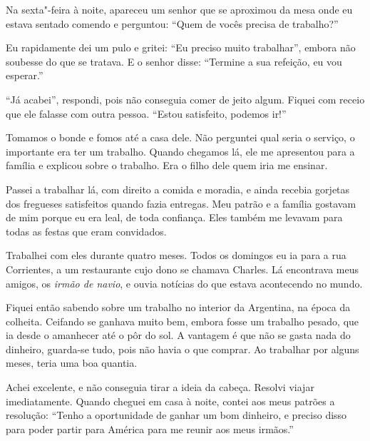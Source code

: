 Na sexta"-feira à noite, apareceu um senhor que se aproximou da mesa onde
eu estava sentado comendo e perguntou: ``Quem de vocês precisa de trabalho?''

Eu rapidamente dei um pulo e gritei: ``Eu preciso muito trabalhar'', embora não soubesse do que se tratava. E o senhor disse: ``Termine a sua refeição, eu vou esperar.''

``Já acabei'', respondi, pois não conseguia comer de jeito algum. Fiquei
com receio que ele falasse com outra pessoa. ``Estou satisfeito, podemos
ir!''

Tomamos o bonde e fomos até a casa dele. Não perguntei qual
seria o serviço, o importante era ter um trabalho. Quando
chegamos lá, ele me apresentou para a família e explicou sobre o
trabalho. Era o filho dele quem iria me ensinar.


Passei a trabalhar lá, com direito a comida e moradia, e ainda
recebia gorjetas dos fregueses satisfeitos quando fazia entregas. Meu
patrão e a família gostavam de mim porque eu era leal, de toda
confiança. Eles também me levavam para todas as festas que eram convidados.

Trabalhei com eles durante quatro meses. Todos os domingos eu ia para a rua
Corrientes, a um restaurante cujo dono se chamava Charles. Lá encontrava meus 
amigos, os \textit{irmão de navio}, e ouvia notícias do
que estava acontecendo no mundo.

Fiquei então sabendo sobre um trabalho no interior da Argentina, na
época da colheita. Ceifando se ganhava muito bem, embora fosse um
trabalho pesado, que ia desde o amanhecer até o pôr do sol. A vantagem é que
não se gasta nada do dinheiro, guarda-se tudo, pois não havia o que
comprar. Ao trabalhar por alguns meses, teria uma boa quantia.

Achei excelente, e não conseguia tirar a ideia da 
cabeça. Resolvi viajar imediatamente. Quando cheguei 
em casa à noite, contei aos meus patrões a resolução: ``Tenho a oportunidade de ganhar um bom dinheiro, e preciso disso para poder 
partir para América para me reunir aos meus irmãos.''


